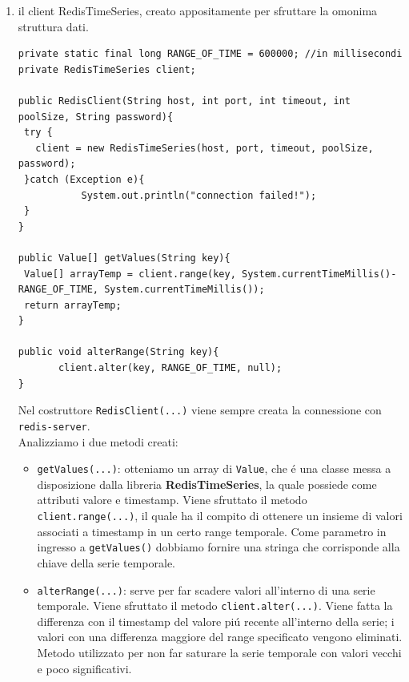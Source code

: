 \begin{enumerate}
    \item il client RedisTimeSeries, creato appositamente per sfruttare la omonima struttura dati.
    \begin{lstlisting}[autogobble, title={\texttt{RedisClient.java}}]
private static final long RANGE_OF_TIME = 600000; //in millisecondi
private RedisTimeSeries client;

public RedisClient(String host, int port, int timeout, int poolSize, String password){
 try {
   client = new RedisTimeSeries(host, port, timeout, poolSize, password);
 }catch (Exception e){
           System.out.println("connection failed!");
 }
}

public Value[] getValues(String key){
 Value[] arrayTemp = client.range(key, System.currentTimeMillis()-RANGE_OF_TIME, System.currentTimeMillis());
 return arrayTemp;
}

public void alterRange(String key){
       client.alter(key, RANGE_OF_TIME, null);
}
\end{lstlisting}
    Nel costruttore \texttt{RedisClient(...)} viene sempre creata la connessione con \texttt{redis-server}.\\
    Analizziamo i due metodi creati:
    \begin{itemize}
        \item \texttt{getValues(...)}:  otteniamo un array di \texttt{Value}, che é una classe messa a disposizione
        dalla libreria \textbf{RedisTimeSeries}, la quale possiede come attributi valore e timestamp.
        Viene sfruttato il metodo \texttt{client.range(...)}, il quale ha il compito di ottenere un insieme di valori associati a timestamp in un certo
        range temporale. Come parametro in ingresso a \texttt{getValues()} dobbiamo fornire una stringa che corrisponde  alla chiave della serie temporale.
        \item \texttt{alterRange(...)}: serve per far scadere valori all'interno di una serie temporale. Viene sfruttato il metodo \texttt{client.alter(...)}.
        Viene fatta la differenza con il timestamp del valore piú recente all'interno della serie; i valori con una differenza maggiore del range specificato vengono eliminati.
        Metodo utilizzato per non far saturare la serie temporale con valori vecchi e poco significativi.
    \end{itemize}
\end{enumerate}



